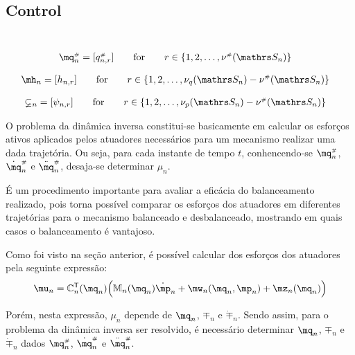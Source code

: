 \subsection{Control}\label{S02-3}

\\

\begin{align}
&	\mq_n\ssh = \nvct{q_{n,r}\ssh}
	\qquad \text{for} \qquad
	r \in \{1, 2, \ldots, \nu\ssh(\ssS_n) \}
	\label{eq:Teste} %
\end{align}

\begin{align}
&	\mh_n = \nvct{h_{n,r}}
	\qquad \text{for} \qquad
	r \in \{1, 2, \ldots, \nu_q(\ssS_n) - \nu\ssh(\ssS_n)\}
	\label{eq:Teste2} %
\end{align}

\begin{align}
&	\mathbb{\psi}_n = \nvct{\psi_{n,r}}
	\qquad \text{for} \qquad
	r \in \{1, 2, \ldots, \nu_p(\ssS_n) - \nu\ssh(\ssS_n)\}
	\label{eq:Teste3} %
\end{align}

O problema da din\^amica inversa constitui-se basicamente em calcular os esfor\c{c}os ativos aplicados pelos atuadores necess\'arios para um mecanismo realizar uma dada trajet\'oria. Ou seja, para cada instante de tempo $t$, conhencendo-se $\mq_n\ssh$, $\dot{\mq}_n\ssh$ e $\ddot{\mq}_n\ssh$, desaja-se determinar $\mu_n$.

\'E um procedimento importante para avaliar a efic\'acia do balanceamento realizado, pois torna poss\'ivel comparar os esfor\c{c}os dos atuadores em diferentes trajet\'orias para o mecanismo balanceado e desbalanceado, mostrando em quais casos o balanceamento \'e vantajoso.

Como foi visto na se\c{c}\~ao anterior, \'e poss\'ivel calcular dos esfor\c{c}os dos atuadores pela seguinte express\~ao:
\begin{equation} \label{eq:InverseDynamics}
\mu_n = \mC_n^\msT(\mq_n) \Big( \mM_n(\mq_n) \dot{\mp}_n + \mw_n(\mq_n, \mp_n) + \mz_n(\mq_n) \Big)
\end{equation}

Por\'em, nesta express\~ao, $\mu_n$ depende de $\mq_n$, $\mp_n$ e $\dot{\mp}_n$. Sendo assim, para o problema da din\^amica inversa ser resolvido, \'e necess\'ario determinar $\mq_n$, $\mp_n$ e $\dot{\mp}_n$ dados $\mq_n\ssh$, $\dot{\mq}_n\ssh$ e $\ddot{\mq}_n\ssh$.

